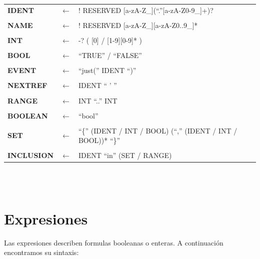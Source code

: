 \documentclass[titlepage, 12pt]{book}
\begin{document}
~\\\\
\begin{tabularx}{\textwidth}{>{\bfseries}llX}
IDENT & $\longleftarrow$ & ! RESERVED [a-zA-Z\_](``.''[a-zA-Z0-9\_]+)?\\\\
NAME & $\longleftarrow$ & ! RESERVED [a-zA-Z\_][a-zA-Z0..9\_]*\\\\
INT & $\longleftarrow$ & -? ( [0] / [1-9][0-9]* )\\\\
BOOL & $\longleftarrow$ & ``TRUE'' / ``FALSE''\\\\
EVENT & $\longleftarrow$ & ``just('' IDENT ``)''\\\\
NEXTREF & $\longleftarrow$ & IDENT `` ' ''\\\\
RANGE & $\longleftarrow$ & INT ``..'' INT\\\\
BOOLEAN & $\longleftarrow$ & ``bool''\\\\
SET & $\longleftarrow$ & ``\{'' (IDENT / INT / BOOL) (``,'' (IDENT / INT / BOOL))* ``\}''\\\\
INCLUSION & $\longleftarrow$ & IDENT ``in'' (SET / RANGE)\\
\end{tabularx}
~\\\\

\section{Expresiones}
Las expresiones describen formulas booleanas o enteras. A continuación encontramos su sintaxis:
\end{document}
